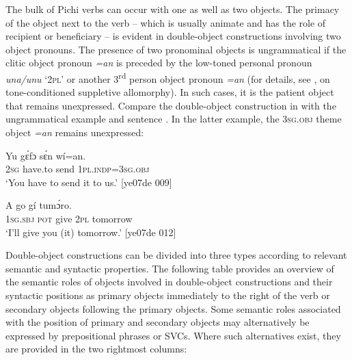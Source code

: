 The bulk of Pichi verbs can occur with one as well as two objects. The primacy of the object next to the verb – which is usually animate and has the role of recipient or beneficiary – is evident in double-object constructions involving two object pronouns. The presence of two pronominal objects is ungrammatical if the clitic object pronoun \textit{=an} is preceded by the low-toned personal pronoun \textit{una/unu} ‘\textsc{2pl}’ or another 3\textsuperscript{rd} person object pronoun \textit{=an} (for details, see , on tone-conditioned suppletive allomorphy). In such cases, it is the patient object that remains unexpressed. Compare the double-object construction in  with the ungrammatical example  and sentence . In the latter example, the \textsc{3sg.obj} theme object \textit{=an} remains unexpressed: 


\ea%
    \label{ex:key:1199}
    \gll Yu  gɛ́fɔ    sɛ́n    wí=an.\\
\textsc{2sg}  have.to  send  \textsc{1pl.indp}=\textsc{3sg.obj}\\

\glt ‘You have to send it to us.’ [ye07de 009]
\z


\z


\ea%
    \label{ex:key:1201}
    \gll A    go  gí    tumɔ́ro.\\
\textsc{1sg.sbj}  \textsc{pot}  give  \textsc{2pl}  tomorrow\\

\glt ‘I’ll give you (it) tomorrow.’ [ye07de 012]
\z

Double-object constructions can be divided into three types according to relevant semantic and syntactic properties. The following table provides an overview of the semantic roles of objects involved in double-object constructions and their syntactic positions as primary objects immediately to the right of the verb or secondary objects following the primary objects. Some semantic roles associated with the position of primary and secondary objects may alternatively be expressed by prepositional phrases or SVCs. Where such alternatives exist, they are provided in the two rightmost columns: 

